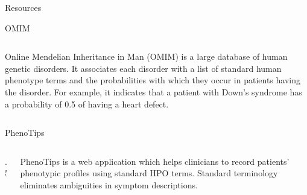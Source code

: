\documentclass[final]{beamer} %
\begin{document}
\begin{frame}{}
\begin{columns}[T]
\begin{column}{0.3\linewidth}
{\begin{block}{\Huge Resources}
\begin{block}{\Large OMIM}
\begin{columns}[T]
        \begin{column}{.5\textwidth}
          \Large Online Mendelian Inheritance in Man (OMIM) is a large
          database of human genetic disorders. It associates each
          disorder with a list of standard human phenotype terms and
          the probabilities with which they occur in patients having
          the disorder. For example, it indicates that a patient with
          Down's syndrome has a probability of 0.5 of having a heart
          defect.
        \end{column}
      \end{columns}
    \end{block}

  

    \begin{block}{\Large PhenoTips}
      \begin{columns}[T]
        \begin{column} {.5\textwidth}
          \centering
        \end{column}
        
        \begin{column}{.5\textwidth}
          \Large PhenoTips is a web application which helps clinicians
          to record patients' phenotypic profiles using standard HPO
          terms. Standard terminology eliminates ambiguities in
          symptom descriptions.
        \end{column}
      \end{columns}
    \end{block}


\end{block}}
\end{column}
\end{columns}
\end{frame}
\end{document}
